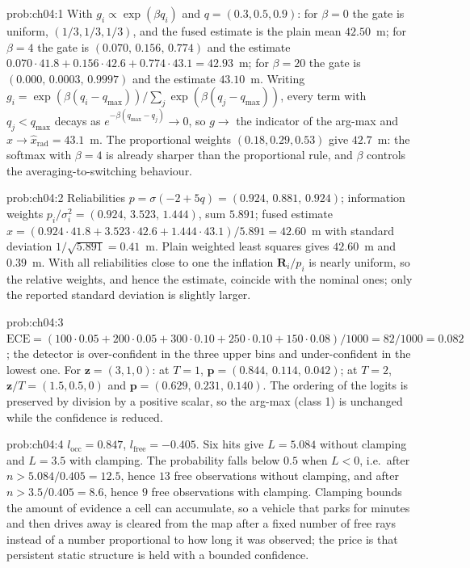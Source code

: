\documentclass[graybox,envcountchap]{style/SNmono}
\begin{document}
\begin{sol}{prob:ch04:1}
With $g_i\propto\exp(\beta q_i)$ and $q=(0.3,0.5,0.9)$: for $\beta=0$ the gate is uniform, $(1/3,1/3,1/3)$, and the fused estimate is the plain mean $42.50$~m; for $\beta=4$ the gate is $(0.070,\,0.156,\,0.774)$ and the estimate $0.070\cdot41.8+0.156\cdot42.6+0.774\cdot43.1=42.93$~m; for $\beta=20$ the gate is $(0.000,\,0.0003,\,0.9997)$ and the estimate $43.10$~m. Writing $g_i=\exp(\beta(q_i-q_{\max}))/\sum_j\exp(\beta(q_j-q_{\max}))$, every term with $q_j<q_{\max}$ decays as $e^{-\beta(q_{\max}-q_j)}\to0$, so $g\to$ the indicator of the arg-max and $\widehat{x}\to\widehat{x}_{\mathrm{rad}}=43.1$~m. The proportional weights $(0.18,0.29,0.53)$ give $42.7$~m: the softmax with $\beta=4$ is already sharper than the proportional rule, and $\beta$ controls the averaging-to-switching behaviour.
\end{sol}
\begin{sol}{prob:ch04:2}
Reliabilities $p=\sigma(-2+5q)=(0.924,\,0.881,\,0.924)$; information weights $p_i/\sigma_i^{2}=(0.924,\,3.523,\,1.444)$, sum $5.891$; fused estimate $\widehat{x}=(0.924\cdot41.8+3.523\cdot42.6+1.444\cdot43.1)/5.891=42.60$~m with standard deviation $1/\sqrt{5.891}=0.41$~m. Plain weighted least squares gives $42.60$~m and $0.39$~m. With all reliabilities close to one the inflation $\mathbf{R}_i/p_i$ is nearly uniform, so the relative weights, and hence the estimate, coincide with the nominal ones; only the reported standard deviation is slightly larger.
\end{sol}
\begin{sol}{prob:ch04:3}
$\mathrm{ECE}=(100\cdot0.05+200\cdot0.05+300\cdot0.10+250\cdot0.10+150\cdot0.08)/1000=82/1000=0.082$; the detector is over-confident in the three upper bins and under-confident in the lowest one. For $\mathbf{z}=(3,1,0)$: at $T=1$, $\mathbf{p}=(0.844,\,0.114,\,0.042)$; at $T=2$, $\mathbf{z}/T=(1.5,0.5,0)$ and $\mathbf{p}=(0.629,\,0.231,\,0.140)$. The ordering of the logits is preserved by division by a positive scalar, so the arg-max (class 1) is unchanged while the confidence is reduced.
\end{sol}
\begin{sol}{prob:ch04:4}
$l_{\mathrm{occ}}=0.847$, $l_{\mathrm{free}}=-0.405$. Six hits give $L=5.084$ without clamping and $L=3.5$ with clamping. The probability falls below $0.5$ when $L<0$, i.e.\ after $n>5.084/0.405=12.5$, hence $13$ free observations without clamping, and after $n>3.5/0.405=8.6$, hence $9$ free observations with clamping. Clamping bounds the amount of evidence a cell can accumulate, so a vehicle that parks for minutes and then drives away is cleared from the map after a fixed number of free rays instead of a number proportional to how long it was observed; the price is that persistent static structure is held with a bounded confidence.
\end{sol}
\end{document}
